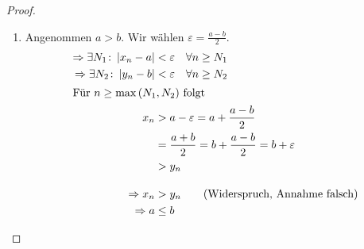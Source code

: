 \begin{satz}
\begin{proof}
\begin{enumerate}[label=(\alph*)]
            \item Angenommen $a > b$. Wir wählen $\varepsilon=\frac{a-b}{2}$.
            \begin{align*}
                \Rightarrow{} \exists N_1\colon \left|x_n-a\right| &< \varepsilon \quad\forall n\geq N_1\\
                \Rightarrow{} \exists N_2\colon \left|y_n-b\right| &< \varepsilon \quad\forall n\geq N_2\\
                \intertext{Für $n\geq \max\left(N_1,N_2\right)$ folgt}
                x_n &> a-\varepsilon = a + \frac{a-b}{2}\\
                &= \frac{a+b}{2} = b+\frac{a-b}{2} = b + \varepsilon\\
                &> y_n\\[10pt]
                \Rightarrow{} x_n &> y_n \tag{Widerspruch, Annahme falsch}\\
                \Rightarrow{} a &\leq b
            \end{align*}
        \end{enumerate}
    \end{proof}
\end{satz}

\newpage

